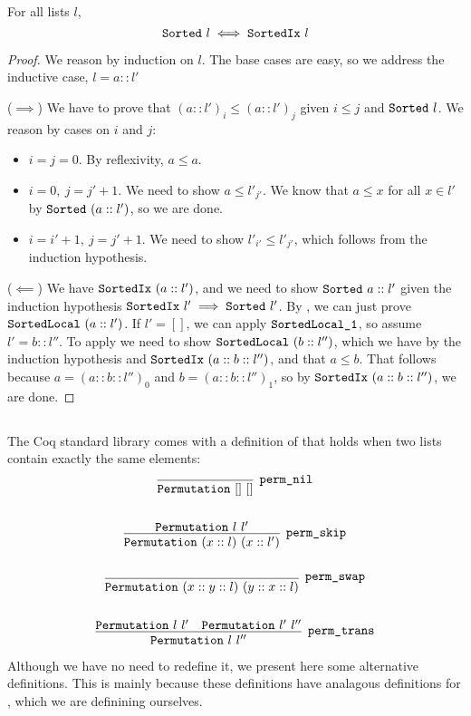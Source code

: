 \documentclass[sigplan,10pt,anonymous,review]{thesis}
\begin{document}
\begin{theorem}
  For all lists $l$,
  \begin{equation*}
    \texttt{Sorted}~l \iff \texttt{SortedIx}~l
  \end{equation*}
\end{theorem}
\begin{proof}
  We reason by induction on $l$. The base cases are easy, so we
  address the inductive case, $l = a :: l'$

  ($\implies$) We have to prove that $(a :: l')_i \le (a :: l')_j$ given
  $i \le j$ and $\texttt{Sorted}~l$. We reason by cases on $i$ and $j$:
  \begin{itemize}
  \item $i = j = 0$. By reflexivity, $a \le a$.
  \item $i = 0,~j=j' + 1$. We need to show $a \le l'_{j'}$. We know that
    $a \le x$ for all $x \in l'$ by $\texttt{Sorted}~(a::l')$, so we are
    done.
  \item $i = i' +1,~j = j' + 1$. We need to show $l'_{i'} \le l'_{j'}$,
    which follows from the induction hypothesis.
  \end{itemize}

  ($\impliedby$) We have $\texttt{SortedIx}~(a :: l')$, and we need to
  show $\texttt{Sorted}~a :: l'$ given the induction hypothesis
  $\texttt{SortedIx}~l' \implies \texttt{Sorted}~l'$. By
  , we can just prove $\texttt{SortedLocal}~(a ::
  l')$. If $l' = []$, we can apply $\texttt{SortedLocal\_1}$, so assume
  $l' = b :: l''$. To apply  we need to show
  $\texttt{SortedLocal}~(b :: l'')$, which we have by the induction
  hypothesis and $\texttt{SortedIx}~(a :: b :: l'')$, and that $a \le b$.
  That follows because $a = (a :: b :: l'')_0$ and $b = (a :: b ::
  l'')_1$, so by $\texttt{SortedIx}~(a :: b :: l'')$, we are done.
\end{proof}

\subsection{}
\label{subsec:perm}

The Coq standard library comes with a definition of 
that holds when two lists contain exactly the same elements:
\begin{gather*}
  \infer[\var{perm\_nil}]{\var{Permutation}~[]~[]}{}
  \\
  \\
  \infer[\var{perm\_skip}]{\var{Permutation}~(x :: l)~(x :: l')}{%
    \var{Permutation}~l~l'
  }
  \\
  \\
  \infer[\var{perm\_swap}]{\var{Permutation}~(x :: y :: l)~(y :: x :: l)}{}
  \\
  \\
  \infer[\var{perm\_trans}]{\var{Permutation}~l~l''}{
    \var{Permutation}~l~l' & \var{Permutation}~l'~l''
  }
\end{gather*}
Although we have no need to redefine it, we present here some
alternative definitions. This is mainly because these definitions have
analagous definitions for , which we are definining
ourselves.
\end{document}
